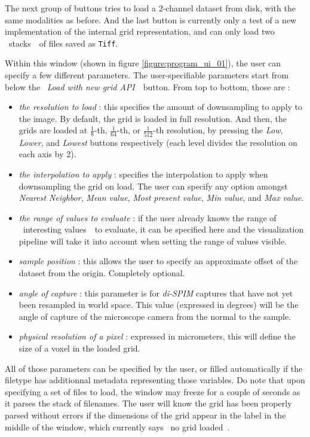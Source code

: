 {{	The next group of buttons tries to load a 2-channel dataset from disk, with the same modalities as before. And the last button is currently only a test of a new implementation of the internal grid representation, and can only load two \guillemotleft{}~stacks~\guillemotright{}~of files saved as \texttt{Tiff}.\par\myparspace
	Within this window (shown in figure \ref{figure:program_ui_01}), the user can specify a few different parameters. The user-specifiable parameters start from below the \guillemotleft{}~\textit{Load with new grid API}~\guillemotright{}~button. From top to bottom, those are :
	\begin{itemize}
		\item \textit{the resolution to load} : this specifies the amount of downsampling to apply to the image. By default, the grid is loaded in full resolution. And then, the grids are loaded at $\frac{1}{8}$-th, $\frac{1}{64}$-th, or $\frac{1}{512}$-th resolution, by pressing the \textit{Low}, \textit{Lower}, and \textit{Lowest} buttons respectively (each level divides the resolution on each axis by 2).
		\item \textit{the interpolation to apply} : specifies the interpolation to apply when downsampling the grid on load. The user can specify any option amongst \textit{Nearest Neighbor}, \textit{Mean value}, \textit{Most present value}, \textit{Min value}, and \textit{Max value}.
		\item \textit{the range of values to evaluate} : if the user already knows the range of \guillemotleft{}~interesting values~\guillemotright{}~to evaluate, it can be specified here and the visualization pipeline will take it into account when setting the range of values visible.
		\item \textit{sample position} : this allows the user to specify an approximate offset of the dataset from the origin. Completely optional.
		\item \textit{angle of capture} : this parameter is for \textit{di-SPIM} captures that have not yet been resampled in world space. This value (expressed in degrees) will be the angle of capture of the microscope camera from the normal to the sample.
		\item \textit{physical resolution of a pixel} : expressed in micrometers, this will define the size of a voxel in the loaded grid.
	\end{itemize}\par
	All of those parameters can be specified by the user, or filled automatically if the filetype has additionnal metadata representing those variables. Do note that upon specifying a set of files to load, the window may freeze for a couple of seconds as it parses the stack of filenames. The user will know the grid has been properly parsed without errors if the dimensions of the grid appear in the label in the middle of the window, which currently says \guillemotleft{}~no grid loaded~\guillemotright{}.\par\myparspace
	}

}
